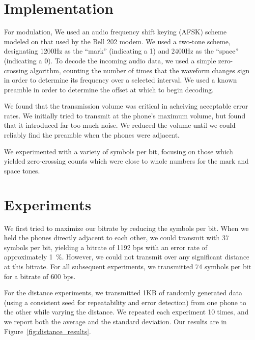 \documentclass{article}
\title{\class} \author{\us}
\begin{document}
\maketitle

\section{Implementation}
For modulation, We used an audio frequency shift keying (AFSK) scheme
modeled on that used by the Bell 202 modem. We used a two-tone scheme,
designating 1200Hz as the ``mark'' (indicating a 1) and 2400Hz as the
``space'' (indicating a 0). To decode the incoming audio data, we used
a simple zero-crossing algorithm, counting the number of times that
the waveform changes sign in order to determine its frequency over a
selected interval. We used a known preamble in order to determine the
offset at which to begin decoding.

We found that the transmission volume was critical in acheiving
acceptable error rates. We initially tried to transmit at the phone's
maximum volume, but found that it introduced far too much noise. We
reduced the volume until we could reliably find the preamble when the
phones were adjacent.

We experimented with a variety of symbols per bit, focusing on those
which yielded zero-crossing counts which were close to whole numbers
for the mark and space tones.

\section{Experiments}
We first tried to maximize our bitrate by reducing the symbols per
bit. When we held the phones directly adjacent to each other, we could
transmit with 37 symbols per bit, yielding a bitrate of 1192 bps with
an error rate of approximately 1~\%. However, we could not transmit
over any significant distance at this bitrate. For all subsequent
experiments, we transmitted 74 symbols per bit for a bitrate of 600
bps.

For the distance experiments, we transmitted 1KB of randomly generated
data (using a consistent seed for repeatability and error detection)
from one phone to the other while varying the distance. We repeated
each experiment 10 times, and we report both the average and the
standard deviation. Our results are in
Figure~\ref{fig:distance_results}.
\end{document}
